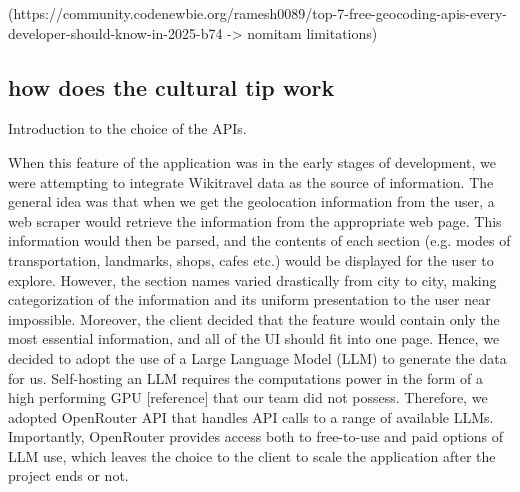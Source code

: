 (https://community.codenewbie.org/ramesh0089/top-7-free-geocoding-apis-every-developer-should-know-in-2025-b74 -> nomitam limitations)

\subsection{how does the cultural tip work}
Introduction to the choice of the APIs.

When this feature of the application was in the early stages of development, we were attempting to integrate Wikitravel data as the source of information. The general idea was that when we get the geolocation information from the user, a web scraper would retrieve the information from the appropriate web page. This information would then be parsed, and the contents of each section (e.g. modes of transportation, landmarks, shops, cafes etc.) would be displayed for the user to explore. However, the section names varied drastically from city to city, making categorization of the information and its uniform presentation to the user near impossible. Moreover, the client decided that the feature would contain only the most essential information, and all of the UI should fit into one page. Hence, we decided to adopt the use of a Large Language Model (LLM) to generate the data for us.  Self-hosting an LLM requires the computations power in the form of a high performing GPU [reference] that our team did not possess. Therefore, we adopted OpenRouter API that handles API calls to a range of available LLMs. Importantly, OpenRouter provides access both to free-to-use and paid options of LLM use, which leaves the choice to the client to scale the application after the project ends or not.  


